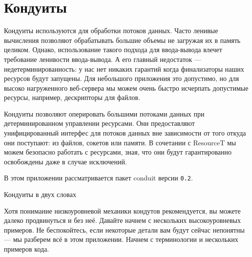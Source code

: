 \chapter{Кондуиты}

Кондуиты используются для обработки потоков данных. Часто ленивые вычисления
позволяют обрабатывать большие объемы не загружая их в память целиком. Однако, 
использование такого подхода для ввода-вывода влечет требование ленивости ввода-вывода.
А его главный недостаток --- недетерминированность: у нас нет никаких гарантий когда
финализаторы наших ресурсов будут запущены. Для небольшого приложения это допустимо, но
для высоко нагруженного веб-сервера мы можем очень быстро исчерпать допустимые ресурсы,
например, дескрипторы для файлов.

Кондуиты позволяют оперировать большими потоками данных при детерминированном управлении
ресурсами. Они предоставляют унифицированный интерфес для потоков данных вне зависимости
от того откуда они поступают: из файлов, сокетов или памяти. В сочетании с ResourceT мы
можем безопасно работать с ресурсами, зная, что они будут гарантированно освобождены даже
в случае исключений.

В этом приложении рассматривается пакет conduit версии \verb=0.2=.


Кондуиты в двух словах

Хотя понимание низкоуровневой механики кондутов рекомендуется, вы можете далеко
продвинуться и без неё. Давайте начнем с нескольких высокоуровневых примеров. Не
беспокойтесь, если некоторые детали вам будут сейчас непонятны --- мы разберем всё в этом
приложении. Начнем с терминологии и нескольких примеров кода.

